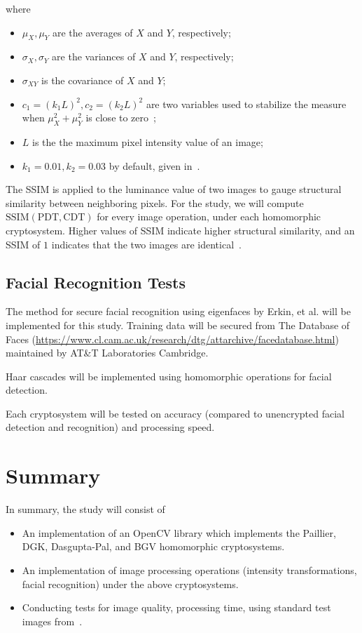 \begin{description}
	where
	\begin{itemize}
		\item $\mu_X, \mu_Y$ are the averages of $X$ and $Y$, respectively;
		\item $\sigma_X, \sigma_Y$ are the variances of $X$ and $Y$, respectively;
		\item $\sigma_{XY}$ is the covariance of $X$ and $Y$;
		\item $c_1 = (k_1L)^2, c_2 = (k_2L)^2$ are two variables used to stabilize the measure when $\mu_X^2+\mu_Y^2$ is close to zero~\cite{akramullah_video_2014};
		\item $L$ is the the maximum pixel intensity value of an image;
		\item $k_1 = 0.01, k_2 = 0.03$ by default, given in~\cite{ahmed_benchmark_2016}.
	\end{itemize}
	The SSIM is applied to the luminance value of two images to gauge structural similarity between neighboring pixels.
    For the study, we will compute $\mathrm{SSIM}(\mathrm{PDT}, \mathrm{CDT})$ for every image operation, under each homomorphic cryptosystem. Higher values of SSIM indicate higher structural similarity, and an SSIM of $1$ indicates that the two images are identical~\cite{ahmed_benchmark_2016}.
\end{description}

\subsection{Facial Recognition Tests}
The method for secure facial recognition using eigenfaces by Erkin, et al. \cite{hutchison_privacy-preserving_2009-2} will be implemented for this study.
Training data will be secured from The Database of Faces (\url{https://www.cl.cam.ac.uk/research/dtg/attarchive/facedatabase.html}) maintained by AT&T Laboratories Cambridge.

Haar cascades will be implemented using homomorphic operations for facial detection.

Each cryptosystem will be tested on accuracy (compared to unencrypted facial detection and recognition) and processing speed.
\section{Summary}
In summary, the study will consist of
\begin{itemize}
	\item An implementation of an OpenCV library which implements the Paillier, DGK, Dasgupta-Pal, and BGV homomorphic cryptosystems.
	\item An implementation of image processing operations (intensity transformations, facial recognition) under the above cryptosystems.
	\item Conducting tests for image quality, processing time, using standard test images from~\cite{gonzalez_image_nodate}.
\end{itemize}

